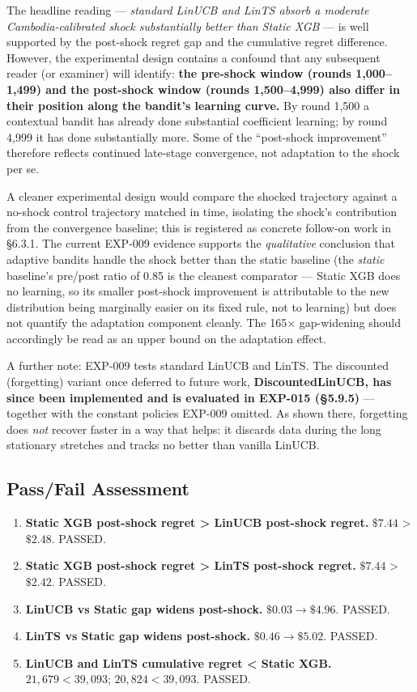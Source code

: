 The headline reading --- \emph{standard LinUCB and LinTS absorb a moderate Cambodia-calibrated shock substantially better than Static XGB} --- is well supported by the post-shock regret gap and the cumulative regret difference. However, the experimental design contains a confound that any subsequent reader (or examiner) will identify: \textbf{the pre-shock window (rounds 1,000--1,499) and the post-shock window (rounds 1,500--4,999) also differ in their position along the bandit's learning curve.} By round 1,500 a contextual bandit has already done substantial coefficient learning; by round 4,999 it has done substantially more. Some of the ``post-shock improvement'' therefore reflects continued late-stage convergence, not adaptation to the shock per se.

A cleaner experimental design would compare the shocked trajectory against a no-shock control trajectory matched in time, isolating the shock's contribution from the convergence baseline; this is registered as concrete follow-on work in §6.3.1. The current EXP-009 evidence supports the \emph{qualitative} conclusion that adaptive bandits handle the shock better than the static baseline (the \emph{static} baseline's pre/post ratio of 0.85 is the cleanest comparator --- Static XGB does no learning, so its smaller post-shock improvement is attributable to the new distribution being marginally easier on its fixed rule, not to learning) but does not quantify the adaptation component cleanly. The 165× gap-widening should accordingly be read as an upper bound on the adaptation effect.

A further note: EXP-009 tests standard LinUCB and LinTS. The discounted (forgetting) variant once deferred to future work, \textbf{DiscountedLinUCB, has since been implemented and is evaluated in EXP-015 (§5.9.5)} --- together with the constant policies EXP-009 omitted. As shown there, forgetting does \emph{not} recover faster in a way that helps: it discards data during the long stationary stretches and tracks no better than vanilla LinUCB.

\subsection{Pass/Fail Assessment}\label{passfail-assessment-6}

\begin{enumerate}
\def\labelenumi{\arabic{enumi}.}
\tightlist
\item
  \textbf{Static XGB post-shock regret \textgreater{} LinUCB post-shock regret.} \(\$7.44\) \textgreater{} \(\$2.48\). PASSED.
\item
  \textbf{Static XGB post-shock regret \textgreater{} LinTS post-shock regret.} \(\$7.44\) \textgreater{} \(\$2.42\). PASSED.
\item
  \textbf{LinUCB vs Static gap widens post-shock.} \(\$0.03 \to \$4.96\). PASSED.
\item
  \textbf{LinTS vs Static gap widens post-shock.} \(\$0.46 \to \$5.02\). PASSED.
\item
  \textbf{LinUCB and LinTS cumulative regret \textless{} Static XGB.} \(21{,}679 < 39{,}093\); \(20{,}824 < 39{,}093\). PASSED.
\end{enumerate}

